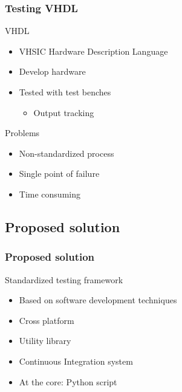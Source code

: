 \documentclass[british,10pt]{beamer}
\begin{document}
\begin{frame}\frametitle{Testing VHDL}
VHDL
\begin{itemize}
\item VHSIC Hardware Description Language
\item Develop hardware
\item Tested with test benches
\begin{itemize}
\item Output tracking
\end{itemize}
\end{itemize}
\vskip5pt
Problems
\begin{itemize}
\item Non-standardized process
\item Single point of failure
\item Time consuming
\end{itemize}
\end{frame}

\subsection{Proposed solution}

\begin{frame}\frametitle{Proposed solution}
Standardized testing framework
\begin{itemize}
\item Based on software development techniques
\item Cross platform
\item Utility library
\item Continuous Integration system
\item At the core: Python script
\end{itemize}
\end{frame}


\end{document}
